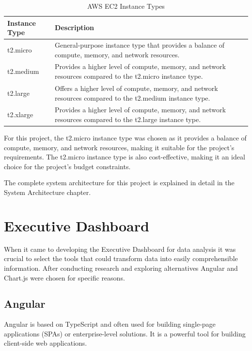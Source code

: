 \begin{table}[H]
    \centering
    \begin{tabularx}{\textwidth}{|l|X|}
        \hline
        \textbf{Instance Type} & \textbf{Description}                                                                                                      \\
        \hline
        t2.micro              & General-purpose instance type that provides a balance of compute, memory, and network resources.                             \\
        \hline
        t2.medium             & Provides a higher level of compute, memory, and network resources compared to the t2.micro instance type.                   \\
        \hline
        t2.large              & Offers a higher level of compute, memory, and network resources compared to the t2.medium instance type.                     \\
        \hline
        t2.xlarge             & Provides a higher level of compute, memory, and network resources compared to the t2.large instance type.                    \\
        \hline
    \end{tabularx}
    \label{tab:aws-instances}
    \caption{AWS EC2 Instance Types}

\end{table}

For this project, the t2.micro instance type was chosen as it provides a balance of compute, memory, and network resources, making it suitable for the project's
requirements. The t2.micro instance type is also cost-effective, making it an ideal choice for the project's budget constraints.

The complete system architecture for this project is explained in detail in the System Architecture chapter.

\section{Executive Dashboard}
When it came to developing the Executive Dashboard for data analysis it was crucial to select the tools that could transform data into easily comprehensible information. After conducting research and exploring alternatives Angular and Chart.js were chosen for specific reasons.

\subsection{Angular}
Angular is based on TypeScript and often used for building single-page applications (SPAs) or enterprise-level solutions. It is a powerful tool for building
client-side web applications.

